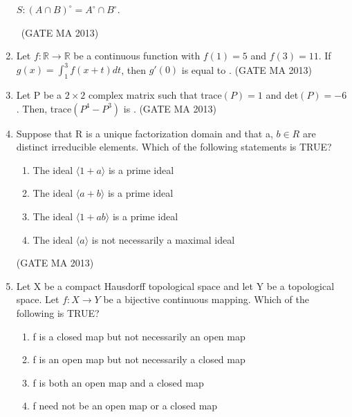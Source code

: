 \documentclass[journal,12pt,onecolumn]{IEEEtran}
\theoremstyle{remark}
\begin{document}
\begin{enumerate}
    $S: (A \cap B)^{\circ} = A^{\circ} \cap B^{\circ}$.
    \begin{enumerate}
    \end{enumerate}\
    \hfill (GATE MA 2013)
    \item Let $f: \mathbb{R} \rightarrow \mathbb{R}$ be a continuous function with $f(1)=5$ and $f(3)=11$. If $g(x) = \int_{1}^{3} f(x+t) dt$, then $g'(0)$ is equal to \underline{\hspace{1cm}}.
    \hfill (GATE MA 2013)
    \item Let P be a $2 \times 2$ complex matrix such that trace$(P)=1$ and det$(P)=-6$. Then, trace$(P^4 - P^3)$ is \underline{\hspace{1cm}}.
    \hfill (GATE MA 2013)
    \item Suppose that R is a unique factorization domain and that a, $b \in R$ are distinct irreducible elements. Which of the following statements is TRUE?
    \begin{enumerate}
        \item The ideal $\langle 1+a \rangle$ is a prime ideal
        \item The ideal $\langle a+b \rangle$ is a prime ideal
        \item The ideal $\langle 1+ab \rangle$ is a prime ideal
        \item The ideal $\langle a \rangle$ is not necessarily a maximal ideal
    \end{enumerate}
    \hfill (GATE MA 2013)
    \item Let X be a compact Hausdorff topological space and let Y be a topological space. Let $f: X \rightarrow Y$ be a bijective continuous mapping. Which of the following is TRUE?
    \begin{enumerate}
        \item f is a closed map but not necessarily an open map
        \item f is an open map but not necessarily a closed map
        \item f is both an open map and a closed map
        \item f need not be an open map or a closed map

\end{enumerate}
\end{enumerate}
\end{document}
